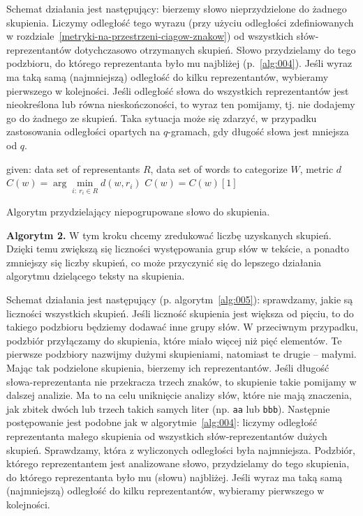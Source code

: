 \documentclass{praca1}
\begin{document}
Schemat działania jest następujący: bierzemy słowo nieprzydzielone do żadnego skupienia. Liczymy odległość tego wyrazu (przy użyciu odległości zdefiniowanych w rozdziale~\ref{metryki-na-przestrzeni-ciagow-znakow}) od wszystkich słów-reprezentantów dotychczasowo otrzymanych skupień. Słowo przydzielamy do tego podzbioru, do którego reprezentanta było mu najbliżej (p.~\ref{alg:004}). Jeśli wyraz ma taką samą (najmniejszą) odległość do kilku reprezentantów, wybieramy pierwszego w kolejności. Jeśli odległość słowa do wszystkich reprezentantów jest nieokreślona lub równa nieskończoności, to wyraz ten pomijamy, tj. nie dodajemy go do żadnego ze skupień. Taka sytuacja może się zdarzyć, w przypadku zastosowania odległości opartych na $q$-gramach, gdy długość słowa jest mniejsza od $q$.

\begin{algorithm}[h!]
\begin{algorithmic}[1]
		\State given: data set of representants $R$, data set of words to categorize $W$, metric $d$
            \State $C(w) = \arg \min\limits_{i:\ r_i \in R} d(w,r_i)$
            	\State $C(w) = C(w)[1]$
            \EndIf
       \EndFor
\end{algorithmic}
\caption{Algorytm przydzielający niepogrupowane słowo do skupienia.}\label{alg:004}
\end{algorithm}

\textbf{Algorytm 2.} W tym kroku chcemy zredukować liczbę uzyskanych skupień. Dzięki temu zwiększą się liczności występowania grup słów w tekście, a ponadto zmniejszy się liczby skupień, co może przyczynić się do lepszego działania algorytmu dzielącego teksty na skupienia.

Schemat działania jest następujący (p. algorytm~\ref{alg:005}): sprawdzamy, jakie są liczności wszystkich skupień. Jeśli liczność skupienia jest większa od pięciu, to do takiego podzbioru będziemy dodawać inne grupy słów. W przeciwnym przypadku, podzbiór przyłączamy do skupienia, które miało więcej niż pięć elementów. Te pierwsze podzbiory nazwijmy dużymi skupieniami, natomiast te drugie -- małymi. Mając tak podzielone skupienia, bierzemy ich reprezentantów. Jeśli długość słowa-reprezentanta nie przekracza trzech znaków, to skupienie takie pomijamy w dalszej analizie. Ma to na celu uniknięcie analizy słów, które nie mają znaczenia, jak zbitek dwóch lub trzech takich samych liter (np. \verb|aa| lub \verb|bbb|). Następnie postępowanie jest podobne jak w algorytmie~\ref{alg:004}: liczymy odległość reprezentanta małego skupienia od wszystkich słów-reprezentantów dużych skupień. Sprawdzamy, która z wyliczonych odległości była najmniejsza. Podzbiór, którego reprezentantem jest analizowane słowo, przydzielamy do tego skupienia, do którego reprezentanta było mu (słowu) najbliżej. Jeśli wyraz ma taką samą (najmniejszą) odległość do kilku reprezentantów, wybieramy pierwszego w kolejności.
\end{document}
